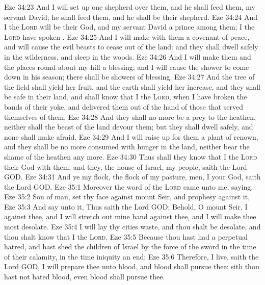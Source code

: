 \vs Eze 34:23 And I will set up one shepherd over them, and he shall feed them,  my servant David; he shall feed them, and he shall be their shepherd.
\vs Eze 34:24 And I the \textsc{Lord} will be their God, and my servant David a prince among them; I the \textsc{Lord} have spoken .
\vs Eze 34:25 And I will make with them a covenant of peace, and will cause the evil beasts to cease out of the land: and they shall dwell safely in the wilderness, and sleep in the woods.
\vs Eze 34:26 And I will make them and the places round about my hill a blessing; and I will cause the shower to come down in his season; there shall be showers of blessing.
\vs Eze 34:27 And the tree of the field shall yield her fruit, and the earth shall yield her increase, and they shall be safe in their land, and shall know that I  the \textsc{Lord}, when I have broken the bands of their yoke, and delivered them out of the hand of those that served themselves of them.
\vs Eze 34:28 And they shall no more be a prey to the heathen, neither shall the beast of the land devour them; but they shall dwell safely, and none shall make  afraid.
\vs Eze 34:29 And I will raise up for them a plant of renown, and they shall be no more consumed with hunger in the land, neither bear the shame of the heathen any more.
\vs Eze 34:30 Thus shall they know that I the \textsc{Lord} their God  with them, and  they,  the house of Israel,  my people, saith the Lord GOD.
\vs Eze 34:31 And ye my flock, the flock of my pasture,  men,  I  your God, saith the Lord GOD.
\vs Eze 35:1 Moreover the word of the \textsc{Lord} came unto me, saying,
\vs Eze 35:2 Son of man, set thy face against mount Seir, and prophesy against it,
\vs Eze 35:3 And say unto it, Thus saith the Lord GOD; Behold, O mount Seir, I  against thee, and I will stretch out mine hand against thee, and I will make thee most desolate.
\vs Eze 35:4 I will lay thy cities waste, and thou shalt be desolate, and thou shalt know that I  the \textsc{Lord}.
\vs Eze 35:5 Because thou hast had a perpetual hatred, and hast shed  the children of Israel by the force of the sword in the time of their calamity, in the time  iniquity  an end:
\vs Eze 35:6 Therefore,  I live, saith the Lord GOD, I will prepare thee unto blood, and blood shall pursue thee: sith thou hast not hated blood, even blood shall pursue thee.

